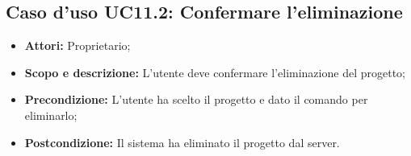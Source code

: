 \subsection{Caso d'uso UC11.2: Confermare l'eliminazione}
\begin{itemize}
	\item \textbf{Attori:} Proprietario;
	\item \textbf{Scopo e descrizione:} L'utente deve confermare l'eliminazione del progetto;
	\item \textbf{Precondizione:} L'utente ha scelto il progetto e dato il comando per eliminarlo;
	\item \textbf{Postcondizione:} Il sistema ha eliminato il progetto dal server.
\end{itemize}